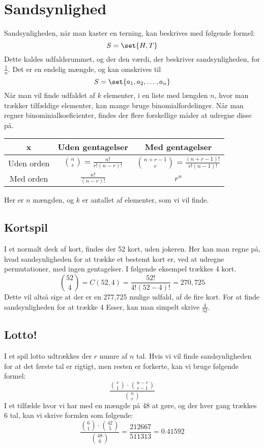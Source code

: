 \section{Sandsynlighed}

Sandsynligheden, når man kaster en terning, kan beskrives med følgende formel:
\begin{equation}
	S=\set{H,T}
\end{equation}
Dette kaldes udfaldsrummet, og der den værdi, der beskriver sandsynligheden, for $\frac{1}{n}$.
Det er en endelig mængde, og kan omskrives til 
\begin{equation}
    S=\set{a_1,a_2,\dots,a_n}
\end{equation}
Når man vil finde udfaldet af $k$ elementer, i en liste med længden $n$, hvor man trækker tilfældige elementer, kan mange bruge binomialfordelinger.
Når man regner binominialkoeficienter, findes der flere forskellige måder at udregne disse på.

\begin{table}[h!]
	\centering
	\begin{tabular}{c|c|c}
		x & Uden gentagelser & Med gentagelser \\\hline
		Uden orden & $\binom{n}{r}=\frac{n!}{r!(n-r)!}$ & $\binom{n+r-1}{r}=\frac{(n+r-1)!}{r!(n-1)!}$ \\\hline
		Med orden & $\frac{n!}{(n-r)!}$ & $r^n$
	\end{tabular}
\end{table}
Her er $n$ mængden, og $k$ er antallet af elementer, som vi vil finde.

\subsection{Kortspil}
I et normalt deck af kort, findes der 52 kort, uden jokeren.
Her kan man regne på, hvad sandsynligheden for at trække et bestemt kort er, ved at udregne permutationer, med ingen gentagelser.
I følgende eksempel trækkes 4 kort.
\begin{equation}
	\binom{52}{4}=C(52,4)=\frac{52!}{4!(52-4)!}=270,725
\end{equation}
Dette vil altså sige at der er en 277,725 mulige udfald, af de fire kort.
For at finde sandsynligheden for at trække 4 Esser, kan man simpelt skrive $\frac{4}{52}$.

\subsection{Lotto!}
I et spil lotto udtrækkes der $r$ numre af $n$ tal.
Hvis vi vil finde sandsynligheden for at det første tal er rigtigt, men resten er forkerte, kan vi bruge følgende formel:
\begin{equation}
	\frac{\binom{r}{1}\cdot\binom{n-r}{r-1}}{\binom{n}{r}}
\end{equation}
I et tilfælde hvor vi har med en mængde på 48 at gøre, og der hver gang trækkes 6 tal, kan vi skrive formlen som følgende:
\begin{equation}
	\frac{\binom{6}{1}\cdot\binom{42}{5}}{\binom{48}{6}}=\frac{212667}{511313}=0.41592
\end{equation}

